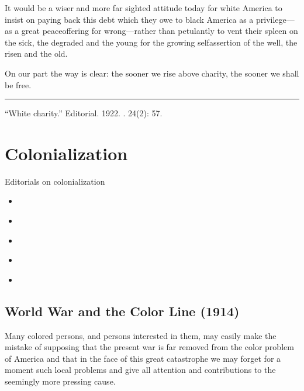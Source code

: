 \documentclass[letterpaper,10pt,english]{jupyterBook}
\begin{document}
\sphinxAtStartPar
It would be a wiser and more far\sphinxhyphen{} sighted attitude today for white America to insist on paying back this debt which they owe to black America as a privilege—as a great peace\sphinxhyphen{}offering for wrong—rather than petulantly to vent their spleen on the sick, the degraded and the young for the growing self\sphinxhyphen{}assertion of the well, the risen and the old.

\sphinxAtStartPar
On our part the way is clear: the sooner we rise above charity, the sooner we shall be free.


\bigskip\hrule\bigskip


\sphinxAtStartPar
{} “White  charity.” Editorial. 1922. . 24(2): 57.


\section{Colonialization}
\label{\detokenize{Sections/colonialization:colonialization}}\label{\detokenize{Sections/colonialization::doc}}
\sphinxAtStartPar
Editorials on colonialization
\begin{itemize}
\item {} 
\sphinxAtStartPar
{\hyperref[\detokenize{Volumes/09/01/worldwar::doc}]{}}

\item {} 
\sphinxAtStartPar
{\hyperref[\detokenize{Volumes/17/04/reconstruction_and_africa::doc}]{}}

\item {} 
\sphinxAtStartPar
{\hyperref[\detokenize{Volumes/19/03/race_pride::doc}]{}}

\item {} 
\sphinxAtStartPar
{\hyperref[\detokenize{Volumes/31/02/firing_line::doc}]{}}

\item {} 
\sphinxAtStartPar
{\hyperref[\detokenize{Volumes/40/01/listen_japan_and_china::doc}]{}}

\end{itemize}


\subsection{World War and the Color Line (1914)}
\label{\detokenize{Volumes/09/01/worldwar:world-war-and-the-color-line-1914}}\label{\detokenize{Volumes/09/01/worldwar::doc}}
\ignorespaces 
{}\ignorespaces 
\sphinxAtStartPar
Many colored persons, and persons interested in them, may easily make the mistake of supposing that the present war is far removed from the color problem of America and that in the face of this great catastrophe we may forget for a moment such local problems and give all attention and contributions to the seemingly more pressing cause.
\end{document}
